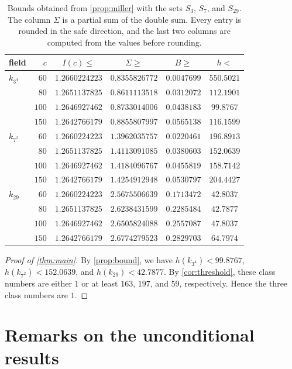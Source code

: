 \documentclass[11pt]{amsart}
\theoremstyle{plain}
\theoremstyle{definition}
\begin{document}
\begin{table}[h]
\centering
\begin{tabular}{lrcccc}
\toprule
field & $c$ & $I(c) \le$ & $\Sigma \ge$ & $B \ge$ & $h <$ \\
\midrule
$k_{3^4}$ & $60$ & $1.2660224223$ & $0.8355826772$ & $0.0047699$ & $550.5021$ \\
 & $80$ & $1.2651137825$ & $0.8611113518$ & $0.0312072$ & $112.1901$ \\
 & $100$ & $1.2646927462$ & $0.8733014006$ & $0.0438183$ & $99.8767$ \\
 & $150$ & $1.2642766179$ & $0.8855807997$ & $0.0565138$ & $116.1599$ \\
\midrule
$k_{7^2}$ & $60$ & $1.2660224223$ & $1.3962035757$ & $0.0220461$ & $196.8913$ \\
 & $80$ & $1.2651137825$ & $1.4113091085$ & $0.0380603$ & $152.0639$ \\
 & $100$ & $1.2646927462$ & $1.4184096767$ & $0.0455819$ & $158.7142$ \\
 & $150$ & $1.2642766179$ & $1.4254912948$ & $0.0530797$ & $204.4427$ \\
\midrule
$k_{29}$ & $60$ & $1.2660224223$ & $2.5675506639$ & $0.1713472$ & $42.8037$ \\
 & $80$ & $1.2651137825$ & $2.6238431599$ & $0.2285484$ & $42.7877$ \\
 & $100$ & $1.2646927462$ & $2.6505824088$ & $0.2557087$ & $47.8037$ \\
 & $150$ & $1.2642766179$ & $2.6774279523$ & $0.2829703$ & $64.7974$ \\
\bottomrule
\end{tabular}
\caption{Bounds obtained from \cref{prop:miller} with the sets $S_3$, $S_7$, and $S_{29}$. The column $\Sigma$ is a partial sum of the double sum. Every entry is rounded in the safe direction, and the last two columns are computed from the values before rounding.}
\label{tab:bounds}
\end{table}

\begin{proof}[Proof of \cref{thm:main}]
By \cref{prop:bound}, we have $h(k_{3^4}) < 99.8767$, $h(k_{7^2}) < 152.0639$, and $h(k_{29}) < 42.7877$.
By \cref{cor:threshold}, these class numbers are either $1$ or at least $163$, $197$, and $59$, respectively.
Hence the three class numbers are $1$.
\end{proof}

\section{Remarks on the unconditional results} \label{sec:remarks}
\end{document}
